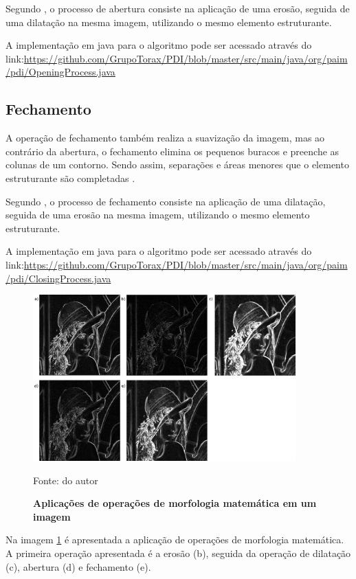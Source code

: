 \documentclass[
	12pt,				%
	oneside,			%
	a4paper,			%
	english,			%
	french,				%
	spanish,			%
	brazil,				%
	]{abntex2}
\begin{document}
Segundo \citet{pedriniSchwartz:2008}, o processo de abertura consiste na aplicação de uma erosão, seguida de uma dilatação na mesma imagem, utilizando o mesmo elemento estruturante.

A implementação em java para o algoritmo pode ser acessado através do link:\url{https://github.com/GrupoTorax/PDI/blob/master/src/main/java/org/paim/pdi/OpeningProcess.java}

\subsection{Fechamento}

A operação de fechamento também realiza a suavização da imagem, mas ao contrário da abertura, o fechamento elimina os pequenos buracos e preenche as colunas de um contorno. Sendo assim, separações e áreas menores que o elemento estruturante são completadas \cite{gonzalesWoods:2008}.

Segundo \citet{pedriniSchwartz:2008}, o processo de fechamento consiste na aplicação de uma dilatação, seguida de uma erosão na mesma imagem, utilizando o mesmo elemento estruturante.

A implementação em java para o algoritmo pode ser acessado através do link:\url{https://github.com/GrupoTorax/PDI/blob/master/src/main/java/org/paim/pdi/ClosingProcess.java}

\begin{figure}[ht]
\centering
\caption{\textbf{Aplicações de operações de morfologia matemática em um imagem}}
\includegraphics[width=0.9\textwidth]{imagens/morfologia.png}

Fonte: do autor
\label{fig:morfologia}
\end{figure}

Na imagem \ref{fig:morfologia} é apresentada a aplicação de operações de morfologia matemática. A primeira operação apresentada é a erosão (b), seguida da operação de dilatação (c), abertura (d) e fechamento (e).
    
\end{document}

